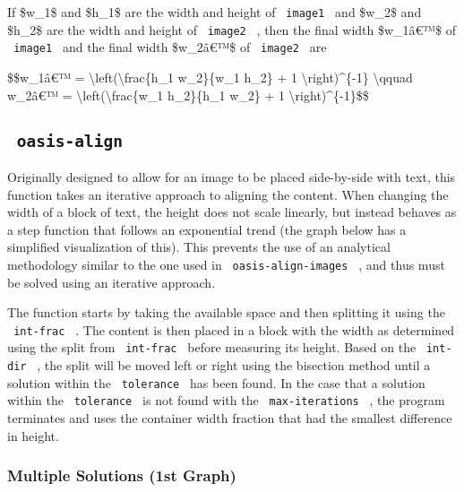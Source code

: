 If \$w\_1\$ and \$h\_1\$ are the width and height of \texttt{\ image1\ }
and \$w\_2\$ and \$h\_2\$ are the width and height of
\texttt{\ image2\ } , then the final width \$w\_1â€™\$ of
\texttt{\ image1\ } and the final width \$w\_2â€™\$ of
\texttt{\ image2\ } are

\$\$w\_1â€™ = \textbackslash left(\textbackslash frac\{h\_1 w\_2\}\{w\_1
h\_2\} + 1 \textbackslash right)\^{}\{-1\} \textbackslash qquad w\_2â€™
= \textbackslash left(\textbackslash frac\{w\_1 h\_2\}\{h\_1 w\_2\} + 1
\textbackslash right)\^{}\{-1\}\$\$

\subsection{\texorpdfstring{\texttt{\ oasis-align\ }}{ oasis-align }}\label{oasis-align-2}

Originally designed to allow for an image to be placed side-by-side with
text, this function takes an iterative approach to aligning the content.
When changing the width of a block of text, the height does not scale
linearly, but instead behaves as a step function that follows an
exponential trend (the graph below has a simplified visualization of
this). This prevents the use of an analytical methodology similar to the
one used in \texttt{\ oasis-align-images\ } , and thus must be solved
using an iterative approach.

The function starts by taking the available space and then splitting it
using the \texttt{\ int-frac\ } . The content is then placed in a block
with the width as determined using the split from \texttt{\ int-frac\ }
before measuring its height. Based on the \texttt{\ int-dir\ } , the
split will be moved left or right using the bisection method until a
solution within the \texttt{\ tolerance\ } has been found. In the case
that a solution within the \texttt{\ tolerance\ } is not found with the
\texttt{\ max-iterations\ } , the program terminates and uses the
container width fraction that had the smallest difference in height.

\pandocbounded{}

\subsubsection{Multiple Solutions (1st
Graph)}\label{multiple-solutions-1st-graph}


